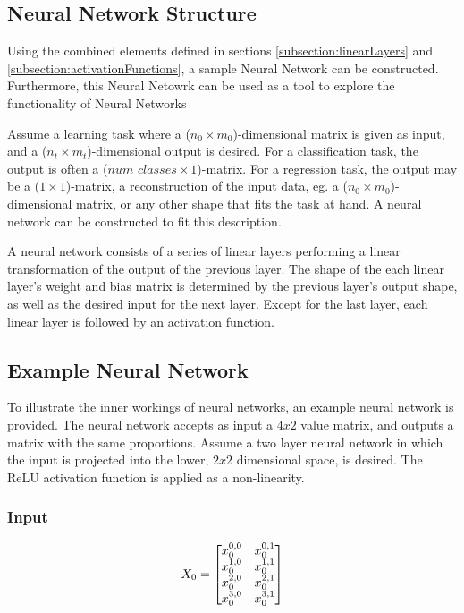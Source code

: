 \subsection{Neural Network Structure}

Using the combined elements defined in sections \ref{subsection:linearLayers} and \ref{subsection:activationFunctions}, 
a sample Neural Network can be constructed. Furthermore, this Neural Netowrk can be used as a tool to explore the functionality of Neural Networks

Assume a learning task where a ($ n_0 \times m_0 $)-dimensional matrix is given as input, and a ($ n_t \times m_t $)-dimensional output is desired. 
For a classification task, the output is often a ($ num\_classes \times 1 $)-matrix. 
For a regression task, the output may be a  ($ 1 \times 1 $)-matrix, a reconstruction of the input data, eg. a ($ n_0 \times m_0 $)-dimensional matrix, 
or any other shape that fits the task at hand.
A neural network can be constructed to fit this description.

A neural network consists of a series of linear layers performing a linear transformation of the output of the previous layer.
The shape of the each linear layer's weight and bias matrix is determined by the previous layer's output shape, 
as well as the desired input for the next layer. Except for the last layer, each linear layer is followed by an activation function.


\subsection{Example Neural Network}
\label{subsection:sample_network}

To illustrate the inner workings of neural networks, an example neural network is provided. 
The neural network accepts as input a $ 4 x 2 $ value matrix, and outputs a matrix with the same proportions.
Assume a two layer neural network in which the input is projected into the lower, $ 2 x 2 $ dimensional space, is desired.
The ReLU activation function is applied as a non-linearity.


\subsubsection{Input}
\[
X_0 = 
\begin{bmatrix}
    x^{0,\space 0}_0 & x^{0,\space 1}_0 \\
    x^{1,\space 0}_0 & x^{1,\space 1}_0 \\
    x^{2,\space 0}_0 & x^{2,\space 1}_0 \\
    x^{3,\space 0}_0 & x^{3,\space 1}_0
\end{bmatrix}
\]


